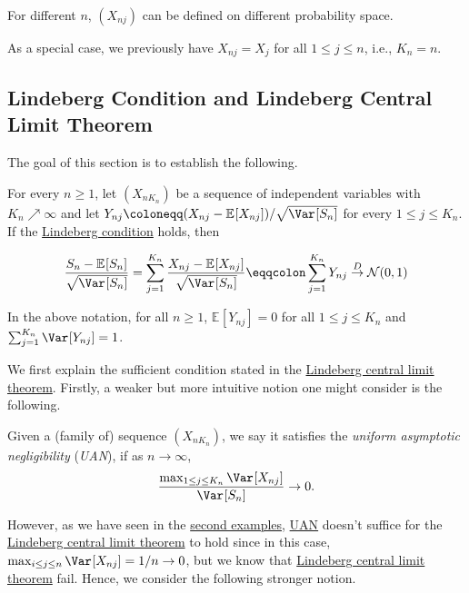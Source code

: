 \begin{remark}
	For different \(n\), \((X_{nj})\) can be defined on different probability space.
\end{remark}

\begin{note}
	As a special case, we previously have \(X_{nj} = X_j\) for all \(1 \leq j \leq n\), i.e., \(K_n = n\).
\end{note}

\subsection{Lindeberg Condition and Lindeberg Central Limit Theorem}
The goal of this section is to establish the following.

\begin{theorem}\label{thm:Lindeberg-CLT}
	For every \(n \geq 1\), let \((X_{n K_n})\) be a sequence of independent variables with \(K_n \nearrow \infty \) and let \(Y_{nj} \coloneqq (X_{nj} - \mathbb{E}_{}[X_{nj}] ) / \sqrt{\Var_{}[S_n] } \) for every \(1 \leq j \leq K_n\). If the \hyperref[def:Lindeberg-condition]{Lindeberg condition} holds, then

	\[
		\frac{S_n - \mathbb{E}_{}[S_n] }{\sqrt{\Var_{}[S_n] } }
		= \sum_{j=1}^{K_n} \frac{X_{nj} - \mathbb{E}_{}[X_{nj}] }{\sqrt{\Var_{}[S_n] } }
		\eqqcolon \sum_{j=1}^{K_n} Y_{nj}
		\overset{D}{\to} \mathcal{N} (0, 1)
	\]
\end{theorem}

\begin{note}
	In the above notation, for all \(n \geq 1\), \(\mathbb{E}_{}[Y_{nj}] = 0\) for all \(1 \leq j \leq K_n\) and \(\sum_{j=1}^{K_n} \Var_{}[Y_{nj}] = 1\).
\end{note}

We first explain the sufficient condition stated in the \hyperref[thm:Lindeberg-CLT]{Lindeberg central limit theorem}. Firstly, a weaker but more intuitive notion one might consider is the following.

\begin{definition}\label{def:uniform-asymptotic-negligibility}
	Given a (family of) sequence \((X_{n K_n})\), we say it satisfies the \emph{uniform asymptotic negligibility} (\emph{UAN}), if as \(n \to \infty \),
	\[
		\frac{\max _{1 \leq j \leq K_n} \Var_{}[X_{nj}] }{\Var_{}[S_n] } \to 0.
	\]
\end{definition}

However, as we have seen in the \hyperref[eg:Poisson-CLT-fail]{second examples}, \hyperref[def:uniform-asymptotic-negligibility]{UAN} doesn't suffice for the \hyperref[thm:Lindeberg-CLT]{Lindeberg central limit theorem} to hold since in this case, \(\max _{i \leq j \leq n} \Var_{}[X_{nj}] = 1 / n \to 0\), but we know that \hyperref[thm:Lindeberg-CLT]{Lindeberg central limit theorem} fail. Hence, we consider the following stronger notion.

